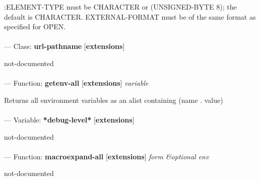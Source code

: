 \begin{adjustwidth}{5em}{5em}
:ELEMENT-TYPE must be CHARACTER or (UNSIGNED-BYTE 8); the default is CHARACTER.
EXTERNAL-FORMAT must be of the same format as specified for OPEN.
\end{adjustwidth}

\paragraph{}
\label{EXTENSIONS:URL-PATHNAME}
--- Class: \textbf{url-pathname} [\textbf{extensions}] \textit{}

\begin{adjustwidth}{5em}{5em}
not-documented
\end{adjustwidth}

\paragraph{}
\label{EXTENSIONS:GETENV-ALL}
--- Function: \textbf{getenv-all} [\textbf{extensions}] \textit{variable}

\begin{adjustwidth}{5em}{5em}
Returns all environment variables as an alist containing (name . value)
\end{adjustwidth}

\paragraph{}
\label{EXTENSIONS:*DEBUG-LEVEL*}
--- Variable: \textbf{*debug-level*} [\textbf{extensions}] \textit{}

\begin{adjustwidth}{5em}{5em}
not-documented
\end{adjustwidth}

\paragraph{}
\label{EXTENSIONS:MACROEXPAND-ALL}
--- Function: \textbf{macroexpand-all} [\textbf{extensions}] \textit{form \&optional env}

\begin{adjustwidth}{5em}{5em}
not-documented
\end{adjustwidth}

